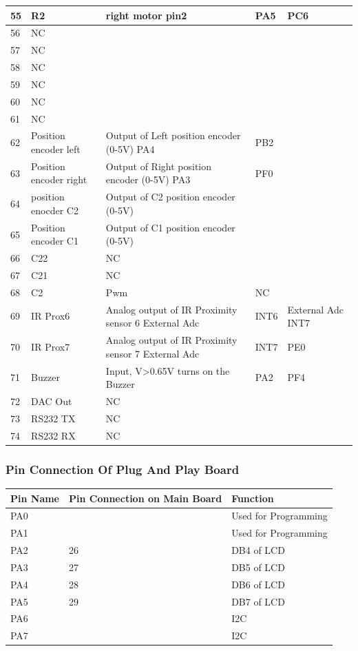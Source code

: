 \documentclass[a4paper,10pt,oneside]{article}
\begin{document}
{\begin{longtable}{|p{}|p{}|p{}|p{}|p{}|}
				55&	R2&	right motor pin2&	PA5 & PC6\\ \hline
				56&	NC&&&	\\ \hline	
				57&	NC&&&	\\ \hline	
				58&	NC&&&	\\ \hline	
				59&	NC&&&	\\ \hline	
				60&	NC&&&	\\ \hline	
				61&	NC&&&	\\ \hline
				62&	Position encoder left&	Output of Left position encoder (0-5V)	PA4&PB2&\\ \hline
				63&	Position encoder right& 	Output of Right position encoder (0-5V)	PA3&PF0&\\ \hline
				64&	position enocder C2&	Output of C2 position encoder (0-5V)&&	\\ \hline
				65&	Position encoder C1& Output of C1 position encoder (0-5V)&&	\\ \hline
				66&	C22&	NC& &	\\ \hline
				67&	C21	& NC& &	\\ \hline
				68&	C2&Pwm&	NC &	\\ \hline
				69&	IR Prox6&	Analog output of IR Proximity sensor 6	External Adc &INT6 &	External Adc INT7\\ \hline
				70&	IR Prox7&	Analog output of IR Proximity sensor 7	External Adc &INT7 & PE0\\ \hline
				71&	Buzzer&	Input, V>0.65V turns on the Buzzer&	PA2 & PF4\\ \hline
				72&	DAC Out&	NC& &	\\ \hline
				73&	RS232 TX&	NC& &	\\ \hline
				74&	RS232 RX&	NC& &	\\ \hline

		\end{longtable}
	\subsubsection{\textbf{Pin Connection Of Plug And Play Board}}
		\begin{longtable}{|p{}|p{}|p{}|}\hline
			Pin Name&	Pin Connection on Main Board&	Function \\ \hline
			PA0&&	Used for Programming\\ \hline
			PA1&&	Used for Programming\\ \hline
			PA2&	26&	DB4 of LCD\\ \hline
			PA3&	27&	DB5 of LCD\\ \hline
			PA4&	28&	DB6 of LCD\\ \hline
			PA5&	29&	DB7 of LCD\\ \hline
			PA6&	&I2C\\ \hline
			PA7&	&I2C\\ \hline
			

\end{longtable}}
\end{document}
